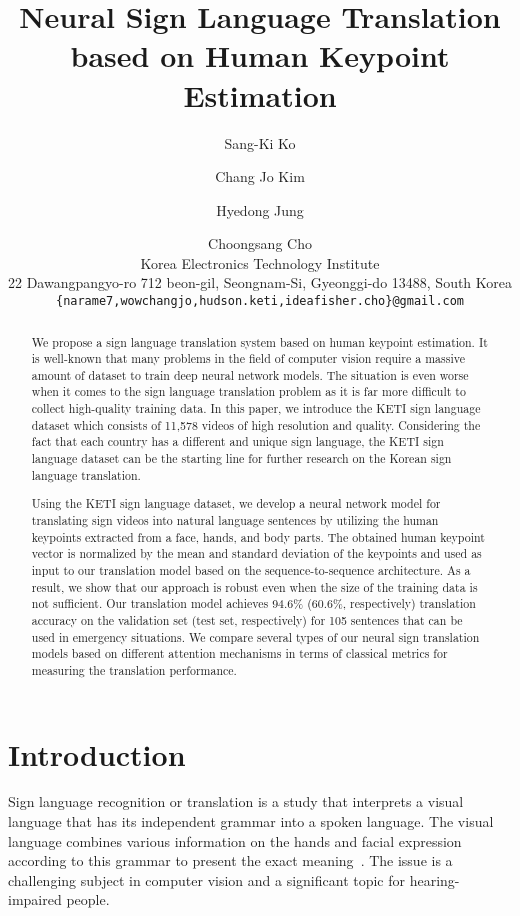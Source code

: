 \documentclass[10pt,twocolumn,letterpaper]{article}
\begin{document}
\title{Neural Sign Language Translation based on Human Keypoint Estimation}

\author{Sang-Ki Ko \and Chang Jo Kim \and Hyedong Jung \and Choongsang Cho\\
Korea Electronics Technology Institute\\
22 Dawangpangyo-ro 712 beon-gil, Seongnam-Si, Gyeonggi-do 13488, South Korea\\
{\tt\small \{narame7,wowchangjo,hudson.keti,ideafisher.cho\}@gmail.com}
}

\maketitle

\begin{abstract}
We propose a sign language translation system based on human keypoint estimation. It is well-known that many problems in the field of computer vision require a massive amount of dataset to train deep neural network models. The situation is even worse when it comes to the sign language translation problem as it is far more difficult to collect high-quality training data. In this paper, we introduce the KETI sign language dataset which consists of 11,578 videos of high resolution and quality. Considering the fact that each country has a different and unique sign language, the KETI sign language dataset can be the starting line for further research on the Korean sign language translation.

Using the KETI sign language dataset, we develop a neural network model for translating sign videos into natural language sentences by utilizing the human keypoints extracted from a face, hands, and body parts. The obtained human keypoint vector is normalized by the mean and standard deviation of the keypoints and used as input to our translation model based on the sequence-to-sequence architecture. As a result, we show that our approach is robust even when the size of the training data is not sufficient. Our translation model achieves 94.6\% (60.6\%, respectively) translation accuracy on the validation set (test set, respectively) for 105 sentences that can be used in emergency situations. We compare several types of our neural sign translation models based on different attention mechanisms in terms of classical metrics for measuring the translation performance.
\end{abstract}

\section{Introduction}
Sign language recognition or translation is a study that interprets a visual language that has its independent grammar into a spoken language. The visual language combines various information on the hands and facial expression according to this grammar to present the exact meaning~\cite{ForsterSHKZPN12,von2008significance}. The issue is a challenging subject in computer vision and a significant topic for hearing-impaired people.
\end{document}
